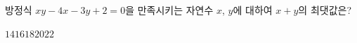 방정식 $xy-4x-3y+2=0$을 만족시키는 자연수 $x$, $y$에 대하여 $x+y$의 최댓값은?
\begin{choices32}{$14$}{$16$}{$18$}{$20$}{$22$}\end{choices32}
